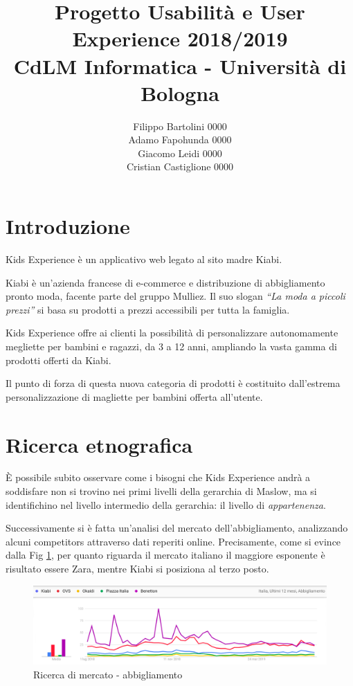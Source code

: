 \documentclass[12pt,italian,]{report}
\title{Progetto Usabilità e User Experience 2018/2019\\[0.8em]\large CdLM Informatica - Università di Bologna}
\author{Filippo Bartolini 0000 \\ Adamo Fapohunda 0000\\ Giacomo Leidi 0000 \\ Cristian Castiglione 0000}
\date{}
\begin{document}
\maketitle

{
\setcounter{tocdepth}{2}
\tableofcontents
}
\newpage
\section{Introduzione}\label{introduzione}
Kids Experience è un applicativo web legato al sito madre Kiabi.

Kiabi è un'azienda francese di e-commerce e distribuzione di
abbigliamento pronto moda, facente parte del gruppo Mulliez. Il suo
slogan \emph{``La moda a piccoli prezzi''} si basa su prodotti a prezzi
accessibili per tutta la famiglia.

Kids Experience offre ai clienti la possibilità di personalizzare
autonomamente megliette per bambini e ragazzi, da 3 a 12 anni, ampliando la vasta gamma di prodotti offerti da Kiabi.

Il punto di forza di questa nuova categoria di prodotti è costituito dall'estrema personalizzazione di magliette per bambini offerta all'utente.

\section{Ricerca etnografica}\label{ricerca-etnografica}
È possibile subito osservare come i bisogni che Kids Experience andrà a soddisfare non si trovino nei primi livelli della gerarchia di Maslow, ma si identifichino nel livello intermedio della gerarchia: il livello
di \emph{appartenenza}.

Successivamente si è fatta un'analisi del mercato dell'abbigliamento, analizzando alcuni competitors attraverso dati reperiti online.
Precisamente, come si evince dalla Fig \ref{abbigliamo_generico}, per quanto riguarda il
mercato italiano il maggiore esponente è risultato essere Zara, mentre Kiabi si posiziona al terzo posto.

\begin{figure}[h]
\centering
\includegraphics{img/abbigliamento_generico.png}
\caption{Ricerca di mercato - abbigliamento}
\label{abbigliamo_generico}
\end{figure}
\end{document}
